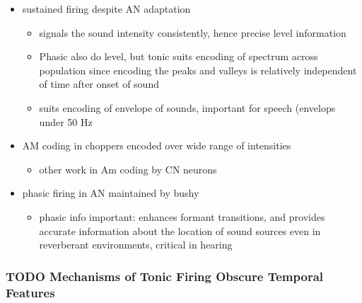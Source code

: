 \begin{itemize}
\item sustained firing despite AN adaptation
\begin{itemize}
\item signals the sound intensity consistently, hence precise level information
\item Phasic also do level, but tonic suits encoding of spectrum across population since encoding the peaks and valleys is relatively independent of time after onset of sound \citep{BlackburnSachs:1990,May:2003,MayPrellEtAl:1998,MaySachs:1998}
\item suits encoding of envelope of sounds, important for speech (envelops under 50 Hz \citep{ShannonZengEtAl:1995}
\end{itemize}
\item AM coding in choppers encoded over wide range of intensities \citep{RhodeGreenberg:1994,FrisinaSmithEtAl:1990}
\begin{itemize}
\item other work in Am coding by CN neurons  \citep{Moller:1972,Moller:1974a,Moller:1974,MooreCashin:1974,Frisina:1984,PalmerWinterEtAl:1986,KimRhodeEtAl:1986,WinterPalmer:1990a,Palmer:1990,PalmerWinter:1992,FrisinaSmithEtAl:1990a,Frisina:1983,GorodetskaiaBibikov:1985,RhodeGreenberg:1994,ShofnerSheftEtAl:1996,FrisinaKarcichEtAl:1996,DAngeloSterbingEtAl:2003,Aggarwal:2003}
\end{itemize}
\item phasic firing in AN maintained by bushy
\begin{itemize}
\item phasic info important: enhances formant transitions, and provides accurate information about the location of sound sources even in reverberant environments, critical in hearing \cite{DelgutteKiang:1984,DelgutteKiang:1984a,DelgutteKiang:1984b,DelgutteKiang:1984c,DelgutteKiang:1984d,DavoreIhlefeldEtAl:2009}
\end{itemize}
\end{itemize}


\subsubsection{TODO Mechanisms of Tonic Firing Obscure Temporal Features}


